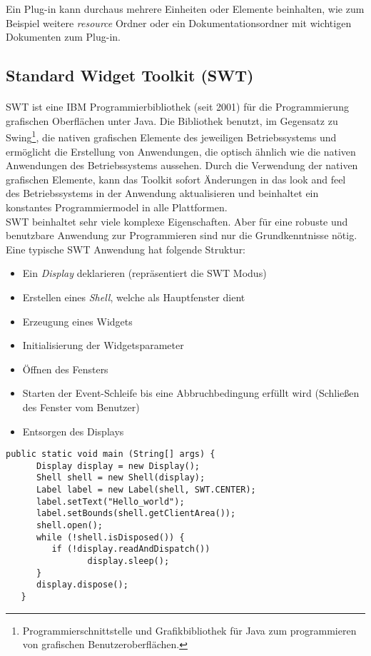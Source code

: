 Ein Plug-in kann durchaus mehrere Einheiten oder Elemente beinhalten, wie zum Beispiel weitere \textit{resource} Ordner oder ein Dokumentationsordner mit wichtigen Dokumenten zum Plug-in.




\subsection{Standard Widget Toolkit (SWT)}
\paragraph{}
SWT ist eine IBM Programmierbibliothek (seit 2001) für die Programmierung grafischen Oberflächen unter Java. Die Bibliothek benutzt, im Gegensatz zu Swing\footnote{Programmierschnittstelle und Grafikbibliothek für Java zum programmieren von grafischen Benutzeroberflächen.}, die nativen grafischen Elemente des jeweiligen Betriebssystems und ermöglicht die Erstellung von Anwendungen, die optisch ähnlich wie die nativen Anwendungen des Betriebssystems aussehen. Durch die Verwendung der nativen grafischen Elemente, kann das Toolkit sofort Änderungen in das \glqq look and feel\grqq~ des Betriebssystems in der Anwendung aktualisieren und beinhaltet ein konstantes Programmiermodel in alle Plattformen.
\cite{EclipseSWT}\\

SWT beinhaltet sehr viele komplexe Eigenschaften. Aber für eine robuste und benutzbare Anwendung zur Programmieren sind nur die Grundkenntnisse nötig. Eine typische SWT Anwendung hat folgende Struktur:

\begin{itemize}
\item Ein \textit{Display} deklarieren (repräsentiert die SWT Modus)
\item Erstellen eines \textit{Shell}, welche als Hauptfenster dient
\item Erzeugung eines Widgets
\item Initialisierung der Widgetsparameter
\item Öffnen des Fensters
\item Starten der Event-Schleife bis eine Abbruchbedingung erfüllt wird (Schließen des Fenster vom Benutzer)
\item Entsorgen des Displays
\end{itemize}

\begin{lstlisting}[caption={Beispiel einer SWT Anwendung}, captionpos=b]
   public static void main (String[] args) {
      Display display = new Display();
      Shell shell = new Shell(display);
      Label label = new Label(shell, SWT.CENTER);
      label.setText("Hello_world");
      label.setBounds(shell.getClientArea());
      shell.open();
      while (!shell.isDisposed()) {
         if (!display.readAndDispatch())
         		display.sleep();
      }
      display.dispose();
   }
\end{lstlisting}

